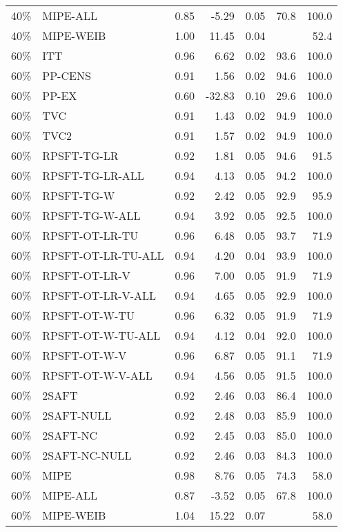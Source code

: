 \begin{table}[ht]
{\begin{tabular}{llrrrrr}
  40\% & MIPE-ALL & 0.85 & -5.29 & 0.05 & 70.8 & 100.0 \\ 
  40\% & MIPE-WEIB & 1.00 & 11.45 & 0.04 &  & 52.4 \\ 
   \hline
60\% & ITT & 0.96 & 6.62 & 0.02 & 93.6 & 100.0 \\ 
  60\% & PP-CENS & 0.91 & 1.56 & 0.02 & 94.6 & 100.0 \\ 
  60\% & PP-EX & 0.60 & -32.83 & 0.10 & 29.6 & 100.0 \\ 
  60\% & TVC & 0.91 & 1.43 & 0.02 & 94.9 & 100.0 \\ 
  60\% & TVC2 & 0.91 & 1.57 & 0.02 & 94.9 & 100.0 \\ 
   \hline
60\% & RPSFT-TG-LR & 0.92 & 1.81 & 0.05 & 94.6 & 91.5 \\ 
  60\% & RPSFT-TG-LR-ALL & 0.94 & 4.13 & 0.05 & 94.2 & 100.0 \\ 
  60\% & RPSFT-TG-W & 0.92 & 2.42 & 0.05 & 92.9 & 95.9 \\ 
  60\% & RPSFT-TG-W-ALL & 0.94 & 3.92 & 0.05 & 92.5 & 100.0 \\ 
  60\% & RPSFT-OT-LR-TU & 0.96 & 6.48 & 0.05 & 93.7 & 71.9 \\ 
  60\% & RPSFT-OT-LR-TU-ALL & 0.94 & 4.20 & 0.04 & 93.9 & 100.0 \\ 
  60\% & RPSFT-OT-LR-V & 0.96 & 7.00 & 0.05 & 91.9 & 71.9 \\ 
  60\% & RPSFT-OT-LR-V-ALL & 0.94 & 4.65 & 0.05 & 92.9 & 100.0 \\ 
   \hline
60\% & RPSFT-OT-W-TU & 0.96 & 6.32 & 0.05 & 91.9 & 71.9 \\ 
  60\% & RPSFT-OT-W-TU-ALL & 0.94 & 4.12 & 0.04 & 92.0 & 100.0 \\ 
  60\% & RPSFT-OT-W-V & 0.96 & 6.87 & 0.05 & 91.1 & 71.9 \\ 
  60\% & RPSFT-OT-W-V-ALL & 0.94 & 4.56 & 0.05 & 91.5 & 100.0 \\ 
   \hline
60\% & 2SAFT & 0.92 & 2.46 & 0.03 & 86.4 & 100.0 \\ 
  60\% & 2SAFT-NULL & 0.92 & 2.48 & 0.03 & 85.9 & 100.0 \\ 
  60\% & 2SAFT-NC & 0.92 & 2.45 & 0.03 & 85.0 & 100.0 \\ 
  60\% & 2SAFT-NC-NULL & 0.92 & 2.46 & 0.03 & 84.3 & 100.0 \\ 
  60\% & MIPE & 0.98 & 8.76 & 0.05 & 74.3 & 58.0 \\ 
  60\% & MIPE-ALL & 0.87 & -3.52 & 0.05 & 67.8 & 100.0 \\ 
  60\% & MIPE-WEIB & 1.04 & 15.22 & 0.07 &  & 58.0 \\ 
   \hline
\end{tabular}
}
\end{table}
